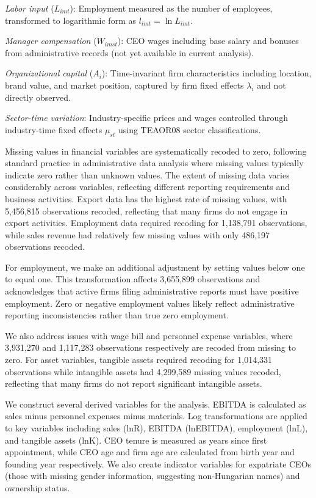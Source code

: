 \documentclass[11pt,a4paper]{article}
\begin{document}
\textit{Labor input} ($L_{imt}$): Employment measured as the number of employees, transformed to logarithmic form as $l_{imt} = \ln L_{imt}$.

\textit{Manager compensation} ($W_{imst}$): CEO wages including base salary and bonuses from administrative records (not yet available in current analysis).

\textit{Organizational capital} ($A_i$): Time-invariant firm characteristics including location, brand value, and market position, captured by firm fixed effects $\lambda_i$ and not directly observed.

\textit{Sector-time variation}: Industry-specific prices and wages controlled through industry-time fixed effects $\mu_{st}$ using TEAOR08 sector classifications.



Missing values in financial variables are systematically recoded to zero, following standard practice in administrative data analysis where missing values typically indicate zero rather than unknown values. The extent of missing data varies considerably across variables, reflecting different reporting requirements and business activities. Export data has the highest rate of missing values, with 5,456,815 observations recoded, reflecting that many firms do not engage in export activities. Employment data required recoding for 1,138,791 observations, while sales revenue had relatively few missing values with only 486,197 observations recoded.

For employment, we make an additional adjustment by setting values below one to equal one. This transformation affects 3,655,899 observations and acknowledges that active firms filing administrative reports must have positive employment. Zero or negative employment values likely reflect administrative reporting inconsistencies rather than true zero employment.

We also address issues with wage bill and personnel expense variables, where 3,931,270 and 1,117,283 observations respectively are recoded from missing to zero. For asset variables, tangible assets required recoding for 1,014,331 observations while intangible assets had 4,299,589 missing values recoded, reflecting that many firms do not report significant intangible assets.

We construct several derived variables for the analysis. EBITDA is calculated as sales minus personnel expenses minus materials. Log transformations are applied to key variables including sales (lnR), EBITDA (lnEBITDA), employment (lnL), and tangible assets (lnK). CEO tenure is measured as years since first appointment, while CEO age and firm age are calculated from birth year and founding year respectively. We also create indicator variables for expatriate CEOs (those with missing gender information, suggesting non-Hungarian names) and ownership status.
\end{document}
